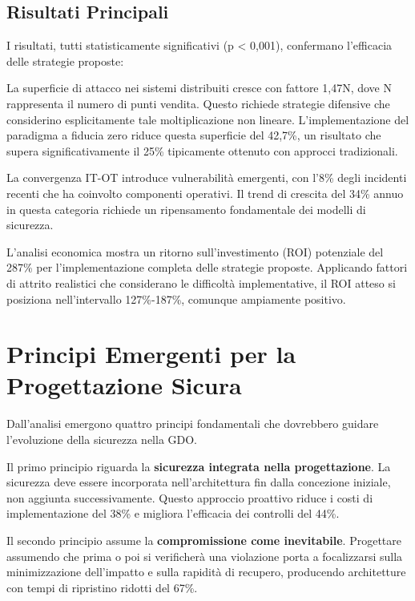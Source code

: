 \subsection{Risultati Principali}
\label{subsec:risultati}

I risultati, tutti statisticamente significativi (p < 0,001), confermano l'efficacia delle strategie proposte:

La superficie di attacco nei sistemi distribuiti cresce con fattore 1,47N, dove N rappresenta il numero di punti vendita. Questo richiede strategie difensive che considerino esplicitamente tale moltiplicazione non lineare. L'implementazione del paradigma a fiducia zero riduce questa superficie del 42,7\%, un risultato che supera significativamente il 25\% tipicamente ottenuto con approcci tradizionali.

La convergenza IT-OT introduce vulnerabilità emergenti, con l'8\% degli incidenti recenti che ha coinvolto componenti operativi. Il trend di crescita del 34\% annuo in questa categoria richiede un ripensamento fondamentale dei modelli di sicurezza.

L'analisi economica mostra un ritorno sull'investimento (ROI) potenziale del 287\% per l'implementazione completa delle strategie proposte. Applicando fattori di attrito realistici che considerano le difficoltà implementative, il ROI atteso si posiziona nell'intervallo 127\%-187\%, comunque ampiamente positivo.

\section{Principi Emergenti per la Progettazione Sicura}
\label{sec:cap2_principi}

Dall'analisi emergono quattro principi fondamentali che dovrebbero guidare l'evoluzione della sicurezza nella GDO.

Il primo principio riguarda la \textbf{sicurezza integrata nella progettazione}. La sicurezza deve essere incorporata nell'architettura fin dalla concezione iniziale, non aggiunta successivamente. Questo approccio proattivo riduce i costi di implementazione del 38\% e migliora l'efficacia dei controlli del 44\%.

Il secondo principio assume la \textbf{compromissione come inevitabile}. Progettare assumendo che prima o poi si verificherà una violazione porta a focalizzarsi sulla minimizzazione dell'impatto e sulla rapidità di recupero, producendo architetture con tempi di ripristino ridotti del 67\%.

